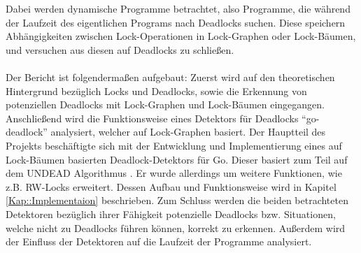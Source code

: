 Dabei werden 
dynamische Programme betrachtet, also Programme, die während der Laufzeit des 
eigentlichen Programs nach Deadlocks suchen. Diese speichern Abhängigkeiten 
zwischen Lock-Operationen in Lock-Graphen oder Lock-Bäumen, und versuchen aus 
diesen auf Deadlocks zu schließen.\\\\
Der Bericht ist folgendermaßen aufgebaut: Zuerst wird auf den theoretischen 
Hintergrund bezüglich Locks und Deadlocks, sowie die Erkennung von 
potenziellen Deadlocks mit Lock-Graphen und Lock-Bäumen eingegangen. Anschließend
wird die Funktionsweise eines Detektors für Deadlocks ``go-deadlock'' 
\cite{sasha-s} analysiert, welcher auf Lock-Graphen basiert. Der Hauptteil 
des Projekts beschäftigte sich mit der Entwicklung und Implementierung eines 
auf Lock-Bäumen basierten Deadlock-Detektors für Go. Dieser basiert zum Teil 
auf dem UNDEAD Algorithmus \cite{zhou}. Er wurde allerdings um weitere Funktionen,
wie z.B. RW-Locks erweitert. Dessen Aufbau und Funktionsweise wird in Kapitel 
\ref{Kap::Implementaion} beschrieben. Zum Schluss werden die beiden betrachteten 
Detektoren bezüglich ihrer Fähigkeit potenzielle Deadlocks bzw. 
Situationen, welche nicht zu Deadlocks führen können, korrekt zu erkennen. Außerdem 
wird der Einfluss der Detektoren auf die Laufzeit der Programme analysiert.


